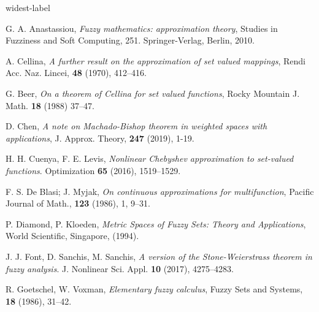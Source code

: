 \documentclass[12pt]{amsart}
\begin{document}
\begin{thebibliography}{widest-label}

 G. A. Anastassiou, \textit{Fuzzy mathematics: approximation theory}, Studies in Fuzziness and Soft Computing, 251. Springer-Verlag, Berlin, 2010.



 A. Cellina,
\textit{A further result on the approximation of set valued mappings}, Rendi Acc. Naz. Lincei, {\bf 48} (1970),
412--416.

 G. Beer, \textit{On a theorem of Cellina for set valued functions}, Rocky Mountain J. Math. \textbf{18} (1988) 37--47.


 D. Chen,
\textit{A note on Machado-Bishop theorem in weighted spaces with applications},
J. Approx. Theory, {\bf 247} (2019), 1-19.


 H. H. Cuenya, F. E. Levis, \textit{Nonlinear Chebyshev approximation to set-valued functions}. Optimization {\bf 65} (2016),  1519--1529.

F. S. De Blasi; J. Myjak,
\textit{On continuous approximations for multifunction},
 Pacific Journal of Math., \textbf{123} (1986), 1, 9--31.


 P. Diamond, P. Kloeden,
\textit{Metric Spaces of Fuzzy Sets: Theory and Applications}, World Scientific, Singapore, (1994).




 J. J. Font, D. Sanchis, M. Sanchis, \textit{A version of the Stone-Weierstrass theorem in fuzzy analysis}. J. Nonlinear Sci. Appl. {\bf 10} (2017),  4275--4283.




 R. Goetschel, W. Voxman,
\textit{Elementary fuzzy calculus}, Fuzzy Sets and Systems, {\bf 18} (1986),
31--42.



%
%
%


\end{thebibliography}
\end{document}

